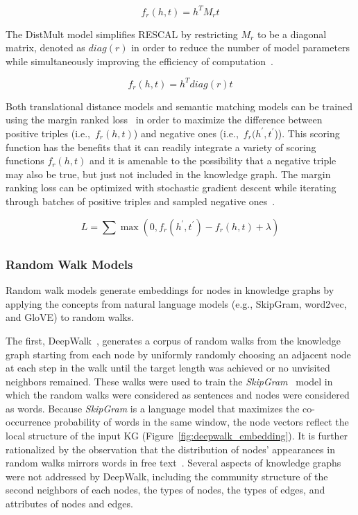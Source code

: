 \begin{equation}
    \label{eq:rescal_scoring_function}
    f_r(h,t) = h^{T} M_{r} t
\end{equation}

The DistMult model simplifies RESCAL by restricting $M_r$ to be a diagonal matrix, denoted as $diag(r)$ in order to reduce the number of model parameters while simultaneously improving the efficiency of computation~\cite{Yang2014}.

\begin{equation}
    \label{eq:distmult_scoring_function}
    f_r(h,t) = h^{T} diag(r) t
\end{equation}

Both translational distance models and semantic matching models can be trained using the margin ranked loss~\cite{Nickel2016,Dettmers2017} in order to maximize the difference between positive triples (i.e.,~$f_r(h,t)$) and negative ones (i.e.,~$f_r(h^{'},t^{'}$)).
This scoring function has the benefits that it can readily integrate a variety of scoring functions $f_r(h, t)$ and it is amenable to the possibility that a negative triple may also be true, but just not included in the knowledge graph.
The margin ranking loss can be optimized with stochastic gradient descent while iterating through batches of positive triples and sampled negative ones~\cite{Bottou2010}.

\begin{equation}
    \label{eq:margin_ranked_loss}
    L = \sum_{}^{}\max(0, f_r(h^{'},t^{'}) - f_r(h,t) + \lambda)
\end{equation}

\subsubsection{Random Walk Models}

Random walk models generate embeddings for nodes in knowledge graphs by applying the concepts from natural language models (e.g., SkipGram, word2vec, and \ac{GloVE}) to random walks.

The first, DeepWalk~\cite{Perozzi2014}, generates a corpus of random walks from the knowledge graph starting from each node by uniformly randomly choosing an adjacent node at each step in the walk until the target length was achieved or no unvisited neighbors remained.
These walks were used to train the \textit{SkipGram}~\cite{Mikolov2013} model in which the random walks were considered as sentences and nodes were considered as words.
Because \textit{SkipGram} is a language model that maximizes the co-occurrence probability of words in the same window, the node vectors reflect the local structure of the input \ac{KG} (Figure~\ref{fig:deepwalk_embedding}).
It is further rationalized by the observation that the distribution of nodes' appearances in random walks mirrors words in free text~\cite{Perozzi2014}.
Several aspects of knowledge graphs were not addressed by DeepWalk, including the community structure of the second neighbors of each nodes, the types of nodes, the types of edges, and attributes of nodes and edges.

